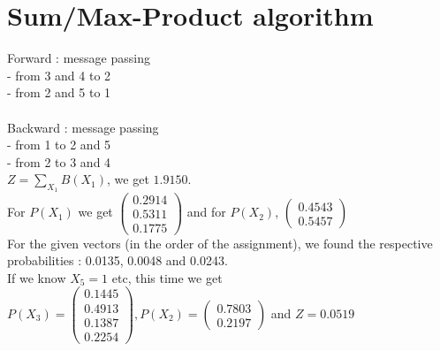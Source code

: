 \documentclass[a4paper, 12pt]{article}
\begin{document}
\section{Sum/Max-Product algorithm}
Forward : message passing 
\\- from 3 and 4 to 2
\\- from 2 and 5 to 1
%
\\ \\Backward : message passing
\\- from 1 to 2 and 5
\\- from 2 to 3 and 4
%
\\[5mm]$Z = \sum\limits_{X_1}{} B(X_1)$, we get $1.9150$.
\\For $P(X_1)$ we get 
$\begin{pmatrix} 0.2914 \\0.5311
    \\0.1775\end{pmatrix} $
    and for $P(X_2)$, $\begin{pmatrix} 0.4543 \\
    0.5457\end{pmatrix} $
%
\\For the given vectors (in the order of the assignment), we found the respective probabilities : 0.0135, 0.0048 and 0.0243.
\\[5mm]If we know $X_5 =1$ etc, this time we get $P(X_3) = \begin{pmatrix}0.1445
    \\0.4913
    \\0.1387
    \\0.2254 \end{pmatrix}, 
   P(X_2) = \begin{pmatrix}
    0.7803
   \\ 0.2197
    \end{pmatrix}$ and $Z =0.0519$
\end{document}
